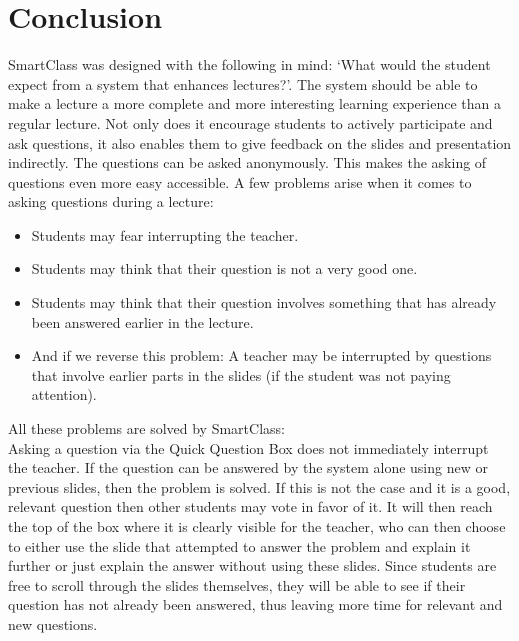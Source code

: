 \documentclass[11pt]{article}
\begin{document}
\section{Conclusion}
SmartClass was designed with the following in mind: `What would the student expect from a system that enhances lectures?'. The system should be able to make a lecture a more complete and more interesting learning experience than a regular lecture. Not only does it encourage students to actively participate and ask questions, it also enables them to give feedback on the slides and presentation indirectly. 
The questions can be asked anonymously. This makes the asking of questions even more easy accessible. A few problems arise when it comes to asking questions during a lecture:
\begin{itemize}
\item Students may fear interrupting the teacher.
\item Students may think that their question is not a very good one.
\item Students may think that their question involves something that has already been answered earlier in the lecture.
\item And if we reverse this problem: A teacher may be interrupted by questions that involve earlier parts in the slides (if the student was not paying attention).
\end{itemize}
All these problems are solved by SmartClass:\\
Asking a question via the Quick Question Box does not immediately interrupt the teacher. If the question can be answered by the system alone using new or previous slides, then the problem is solved. If this is not the case and it is a good, relevant question then other students may vote in favor of it. It will then reach the top of the box where it is clearly visible for the teacher, who can then choose to either use the slide that attempted to answer the problem and explain it further or just explain the answer without using these slides. Since students are free to scroll through the slides themselves, they will be able to see if their question has not already been answered, thus leaving more time for relevant and new questions.
\end{document}

